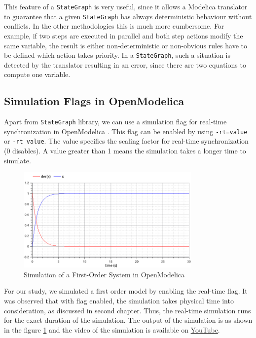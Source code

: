 \documentclass[12pt]{report}
\begin{document}
This feature of a \texttt{StateGraph} is very useful, since it allows a Modelica translator to guarantee that a given \texttt{StateGraph} has always deterministic behaviour without conflicts. In the other methodologies this is much more cumbersome. For example, if two steps are executed in parallel and both step actions modify the same variable, the result is either non-deterministic or non-obvious rules have to be defined which action takes priority. In a \texttt{StateGraph}, such a situation is detected by the translator resulting in an error, since there are two equations to compute one variable. \\

\subsection{Simulation Flags in OpenModelica}
Apart from \texttt{StateGraph} library, we can use a simulation flag \cite{flags} for real-time synchronization in OpenModelica . This flag can be enabled by using \texttt{-rt=value} or \texttt{-rt value}. The value specifies the scaling factor for real-time synchronization (0 disables). A value greater than 1 means the simulation takes a longer time to simulate. 
\begin{figure}[h]
\centering
\includegraphics[width=0.8\textwidth]{images/flag.png}
\caption{Simulation of a First-Order System in OpenModelica}
\label{fig:first-order-rt}
\end{figure}
For our study, we simulated a first order model by enabling the real-time flag. It was observed that with flag enabled, the simulation takes physical time into consideration, as discussed in second chapter. Thus, the real-time simulation runs for the exact duration of the simulation. The output of the simulation is as shown in the figure \ref{fig:first-order-rt} and the video of the simulation is available on \href{https://youtu.be/s2oELiNWK40}{YouTube}.
\end{document}
